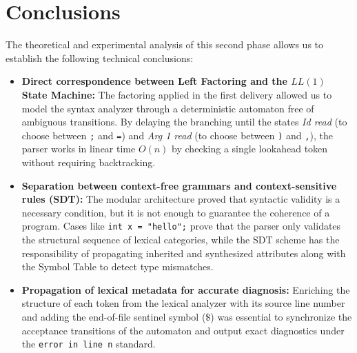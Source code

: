 \documentclass[letterpaper,12pt,oneside]{article}
\begin{document}
\section{Conclusions}

The theoretical and experimental analysis of this second phase allows us to establish the following technical conclusions:

\begin{itemize}
    \item \textbf{Direct correspondence between Left Factoring and the $LL(1)$ State Machine:} The factoring applied in the first delivery allowed us to model the syntax analyzer through a deterministic automaton free of ambiguous transitions. By delaying the branching until the states \textit{Id read} (to choose between \texttt{;} and \texttt{=}) and \textit{Arg 1 read} (to choose between \texttt{)} and \texttt{,}), the parser works in linear time $O(n)$ by checking a single lookahead token without requiring backtracking.
    \item \textbf{Separation between context-free grammars and context-sensitive rules (SDT):} The modular architecture proved that syntactic validity is a necessary condition, but it is not enough to guarantee the coherence of a program. Cases like \texttt{int x = "hello";} prove that the parser only validates the structural sequence of lexical categories, while the SDT scheme has the responsibility of propagating inherited and synthesized attributes along with the Symbol Table to detect type mismatches.
    \item \textbf{Propagation of lexical metadata for accurate diagnosis:} Enriching the structure of each token from the lexical analyzer with its source line number and adding the end-of-file sentinel symbol ($\$$) was essential to synchronize the acceptance transitions of the automaton and output exact diagnostics under the \texttt{error in line n} standard.
\end{itemize}

\printbibliography
\end{document}
